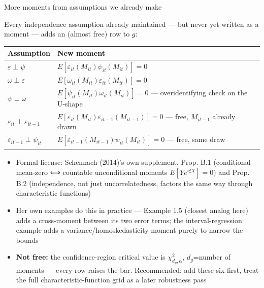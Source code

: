 \documentclass[
  ignorenonframetext,
  aspectratio=169,
]{beamer}
\newcounter{none} %
\providecommand{\tightlist}{%
  \setlength{\itemsep}{0pt}\setlength{\parskip}{0pt}}
\begin{document}
\begin{frame}{More moments from assumptions we already make}
\protect{}\label{more-moments-from-assumptions-we-already-make}
\scriptsize

Every independence assumption already maintained --- but never yet
written as a moment --- adds an (almost free) row to \(g\):

{\def\LTcaptype{none} %
\begin{longtable}[]{@{}
  >{\raggedright\arraybackslash}p{}
  >{\raggedright\arraybackslash}p{}@{}}
\toprule\noalign{}
\begin{minipage}[b]{\linewidth}\raggedright
Assumption
\end{minipage} & \begin{minipage}[b]{\linewidth}\raggedright
New moment
\end{minipage} \\
\midrule\noalign{}
\endhead
\(\varepsilon\perp\psi\) &
\(E[\varepsilon_{it}(M_{it})\psi_{it}(M_{it})]=0\) \\
\(\omega\perp\varepsilon\) &
\(E[\omega_{it}(M_{it})\varepsilon_{it}(M_{it})]=0\) \\
\(\psi\perp\omega\) & \(E[\psi_{it}(M_{it})\omega_{it}(M_{it})]=0\) ---
overidentifying check on the U-shape \\
\(\varepsilon_{it}\perp\varepsilon_{it-1}\) &
\(E[\varepsilon_{it}(M_{it})\varepsilon_{it-1}(M_{it-1})]=0\) --- free,
\(M_{it-1}\) already drawn \\
\(\varepsilon_{it-1}\perp\psi_{it}\) &
\(E[\varepsilon_{it-1}(M_{it-1})\psi_{it}(M_{it})]=0\) --- free, same
draw \\
\bottomrule\noalign{}
\end{longtable}
}

\begin{itemize}
\tightlist
\item
  Formal license: Schennach (2014)'s own supplement, Prop. B.1
  (conditional-mean-zero ⟺ countable unconditional moments
  \(E[Ye^{i\xi X}]=0\)) and Prop. B.2 (independence, not just
  uncorrelatedness, factors the same way through characteristic
  functions)
\item
  Her own examples do this in practice --- Example 1.5 (closest analog
  here) adds a cross-moment between its two error terms; the
  interval-regression example adds a variance/homoskedasticity moment
  purely to narrow the bounds
\item
  \textbf{Not free:} the confidence-region critical value is
  \(\chi^2_{d_g,\alpha}\), \(d_g\)=number of moments --- every row
  raises the bar. Recommended: add these six first, treat the full
  characteristic-function grid as a later robustness pass
\end{itemize}
\end{frame}
\end{document}
